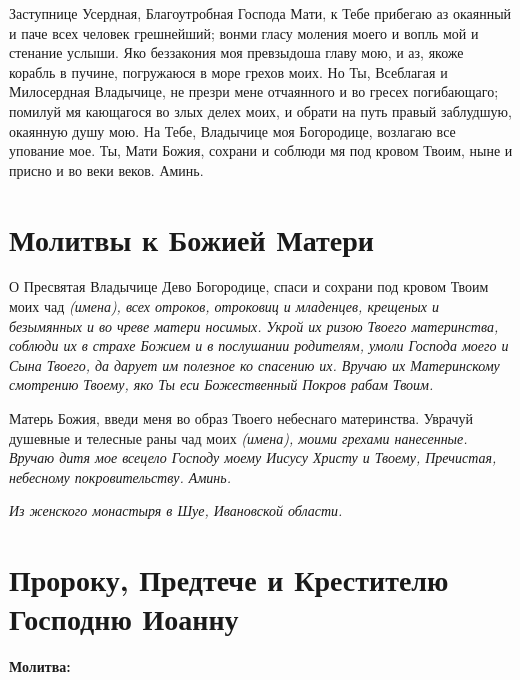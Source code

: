 Заступнице Усердная, Благоутробная Господа Мати, к Тебе прибегаю аз окаянный и паче всех человек грешнейший; вонми гласу моления моего и вопль мой и стенание услыши. Яко беззакония моя превзыдоша главу мою, и аз, якоже корабль в пучине, погружаюся в море грехов моих. Но Ты, Всеблагая и Милосердная Владычице, не презри мене отчаянного и во гресех погибающаго; помилуй мя кающагося во злых делех моих, и обрати на путь правый заблудшую, окаянную душу мою. На Тебе, Владычице моя Богородице, возлагаю все упование мое. Ты, Мати Божия, сохрани и соблюди мя под кровом Твоим, ныне и присно и во веки веков. Аминь.

\section{Молитвы к Божией Матери}
 

О Пресвятая Владычице Дево Богородице, спаси и сохрани под кровом Твоим моих чад \itshape (имена)\normalfont{}, всех отроков, отроковиц и младенцев, крещеных и безымянных и во чреве матери носимых. Укрой их ризою Твоего материнства, соблюди их в страхе Божием и в послушании родителям, умоли Господа моего и Сына Твоего, да дарует им полезное ко спасению их. Вручаю их Материнскому смотрению Твоему, яко Ты еси Божественный Покров рабам Твоим.

Матерь Божия, введи меня во образ Твоего небеснаго материнства. Уврачуй душевные и телесные раны чад моих \itshape (имена)\normalfont{}, моими грехами нанесенные. Вручаю дитя мое всецело Господу моему Иисусу Христу и Твоему, Пречистая, небесному покровительству. Аминь.

\longpage{}\itshape Из женского монастыря в Шуе, Ивановской области.\normalfont{} 


\section{Пророку, Предтече и Крестителю Господню Иоанну}
 
\bfseries Молитва:\normalfont{}


